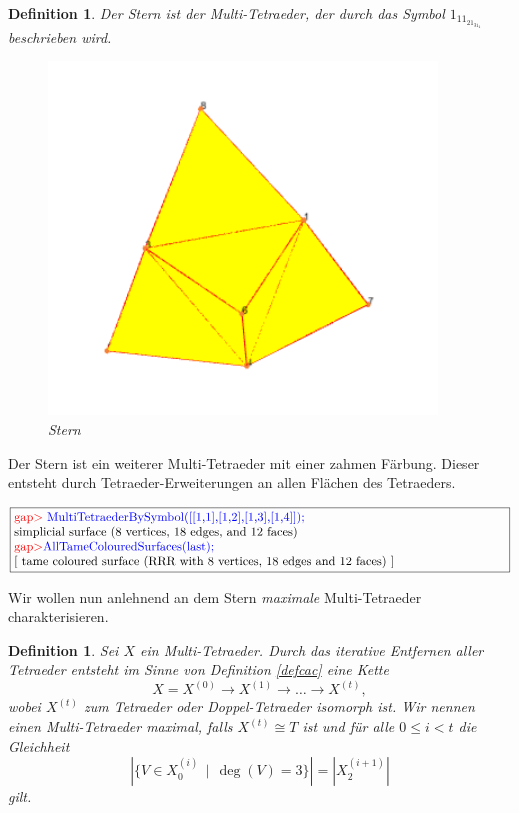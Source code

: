 \documentclass[12pt,titlepage,twoside,cleardoublepage]{article}
\theoremstyle{nummermitklammern}
\newtheorem{definition}[temp]{Definition}
\newtheorem{definition}[zahl]{Definition}
\numberwithin{equation}{section}
\begin{document}
\begin{definition}
Der \emph{Stern} ist der Multi-Tetraeder, der durch das Symbol $1_11_21_31_4$ beschrieben wird.
\begin{figure}[H]
\begin{center}
\includegraphics[scale=0.7,viewport=0cm 2.5cm 8cm 8cm]{star}
\end{center}
\caption{Stern}
\end{figure}
\end{definition}
Der Stern ist ein weiterer Multi-Tetraeder mit einer zahmen Färbung. Dieser entsteht durch Tetraeder-Erweiterungen an allen Flächen des Tetraeders. 
\begin{center}
$\fbox{\parbox{14cm}{
\textcolor{red}{gap$>$} \textcolor{blue}{MultiTetraederBySymbol([[1,1],[1,2],[1,3],[1,4]]);}\newline
simplicial surface (8 vertices, 18 edges, and 12 faces)\newline
\textcolor{red}{gap$>$}\textcolor{blue}{ AllTameColouredSurfaces(last);}\newline
[ tame coloured surface (RRR with 8 vertices, 18 edges and 12 faces)
 ]
}}$
\end{center}
Wir wollen nun anlehnend an dem Stern \emph{maximale} Multi-Tetraeder charakterisieren.
\begin{definition}
Sei $X$ ein Multi-Tetraeder. Durch das iterative Entfernen aller Tetraeder entsteht im Sinne von Definition \ref{defcac} eine Kette 
\[
X=X^{(0)}\to X^{(1)}\to \ldots \to X^{(t)},
\]
wobei $X^{(t)}$ zum Tetraeder oder Doppel-Tetraeder isomorph ist.
Wir nennen einen Multi-Tetraeder \emph{maximal}, falls $X^{(t)}\cong T$ ist und für alle $0\leq i< t$ die Gleichheit
\[
\left| \{V\in X_0^{(i)}\,\mid \, \deg(V)=3\}\right|=\left| X^{(i+1)}_2\right| 
\]
gilt.
\end{definition}
\end{document}
